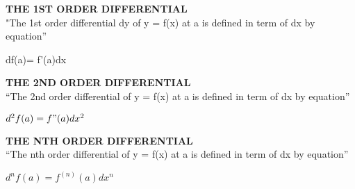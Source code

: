 \documentclass[10pt]{article}
\begin{document}
\pagebreak
 \textbf{THE 1ST ORDER DIFFERENTIAL}\\
"The 1st order differential dy  of y = f(x) at a is defined in term of dx by equation''
\begin{mybox}
\begin{center}
df(a)= f'(a)dx
\end{center}
\end{mybox}
 \textbf{THE 2ND ORDER DIFFERENTIAL}\\
``The 2nd order differential of y = f(x) at a is defined in term of dx by equation''
\begin{mybox}
\begin{center}
$d^2f(a)=f"(a)dx^2$
\end{center}
\end{mybox}
 \textbf{THE NTH ORDER DIFFERENTIAL}\\
``The nth order differential of y = f(x) at a is defined in term of dx by equation''
\begin{mybox}
\begin{center}
$d^nf(a)=f^{(n)}(a)dx^n$
\end{center}
\end{mybox}
\end{document}
